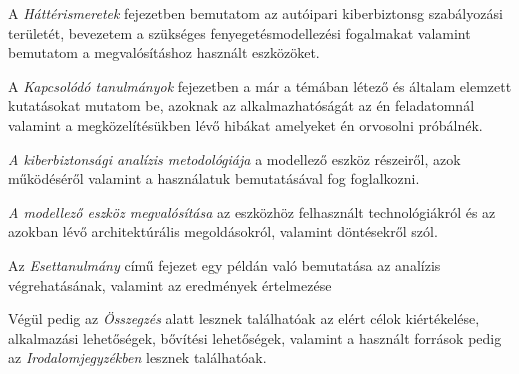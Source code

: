 A \textit{Háttérismeretek} fejezetben bemutatom az autóipari kiberbiztonsg szabályozási területét, bevezetem a szükséges fenyegetésmodellezési fogalmakat valamint bemutatom a megvalósításhoz használt eszközöket.

A \textit{Kapcsolódó tanulmányok} fejezetben a már a témában létező és általam elemzett kutatásokat mutatom be, azoknak az alkalmazhatóságát az én feladatomnál valamint a megközelítésükben lévő hibákat amelyeket én orvosolni próbálnék.

\textit{A kiberbiztonsági analízis metodológiája} a modellező eszköz részeiről, azok működéséről valamint a használatuk bemutatásával fog foglalkozni.

\textit{A modellező eszköz megvalósítása} az eszközhöz felhasznált technológiákról és az azokban lévő architektúrális megoldásokról, valamint döntésekről szól.

Az \textit{Esettanulmány} című fejezet egy példán való bemutatása az analízis végrehatásának, valamint az eredmények értelmezése

Végül pedig az \textit{Összegzés} alatt lesznek találhatóak az elért célok kiértékelése, alkalmazási lehetőségek, bővítési lehetőségek, valamint a használt források pedig az \textit{Irodalomjegyzékben} lesznek találhatóak.



